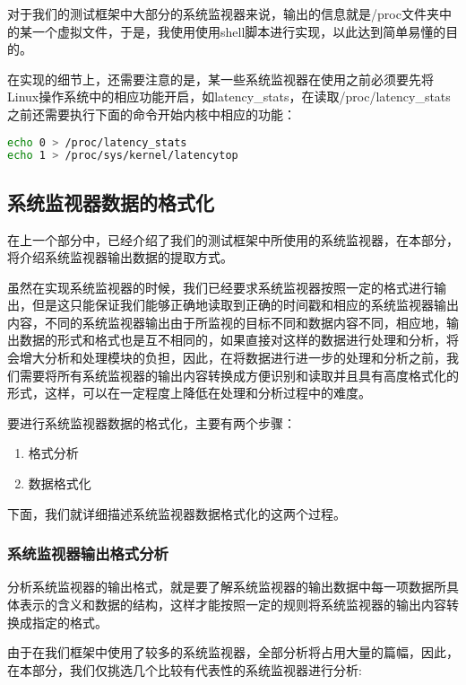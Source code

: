 对于我们的测试框架中大部分的系统监视器来说，输出的信息就是/proc文件夹中的某一个虚拟文件，于是，我使用使用shell脚本进行实现，以此达到简单易懂的目的。

在实现的细节上，还需要注意的是，某一些系统监视器在使用之前必须要先将Linux操作系统中的相应功能开启，如latency\_stats，在读取/proc/latency\_stats之前还需要执行下面的命令开始内核中相应的功能：

\begin{lstlisting}[language=bash]
echo 0 > /proc/latency_stats
echo 1 > /proc/sys/kernel/latencytop
\end{lstlisting}

\subsection{系统监视器数据的格式化}

在上一个部分中，已经介绍了我们的测试框架中所使用的系统监视器，在本部分，将介绍系统监视器输出数据的提取方式。

虽然在实现系统监视器的时候，我们已经要求系统监视器按照一定的格式进行输出，但是这只能保证我们能够正确地读取到正确的时间戳和相应的系统监视器输出内容，不同的系统监视器输出由于所监视的目标不同和数据内容不同，相应地，输出数据的形式和格式也是互不相同的，如果直接对这样的数据进行处理和分析，将会增大分析和处理模块的负担，因此，在将数据进行进一步的处理和分析之前，我们需要将所有系统监视器的输出内容转换成方便识别和读取并且具有高度格式化的形式，这样，可以在一定程度上降低在处理和分析过程中的难度。

要进行系统监视器数据的格式化，主要有两个步骤：
\begin{enumerate}
\item 格式分析
\item 数据格式化
\end{enumerate}

下面，我们就详细描述系统监视器数据格式化的这两个过程。

\subsubsection{系统监视器输出格式分析}
分析系统监视器的输出格式，就是要了解系统监视器的输出数据中每一项数据所具体表示的含义和数据的结构，这样才能按照一定的规则将系统监视器的输出内容转换成指定的格式。

由于在我们框架中使用了较多的系统监视器，全部分析将占用大量的篇幅，因此，在本部分，我们仅挑选几个比较有代表性的系统监视器进行分析:

